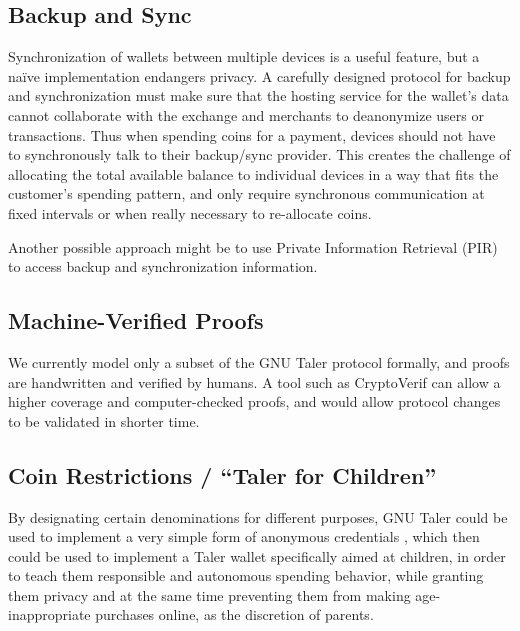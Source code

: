 \subsection*{Backup and Sync}\label{sec:future-work-backup-sync}
Synchronization of wallets between multiple devices is a useful feature, but a
na\"ive implementation endangers privacy.  A carefully designed protocol for
backup and synchronization must make sure that the hosting service for the
wallet's data cannot collaborate with the exchange and merchants to deanonymize
users or transactions.  Thus when spending coins for a payment, devices should
not have to synchronously talk to their backup/sync provider.  This creates the
challenge of allocating the total available balance to individual devices in a
way that fits the customer's spending pattern, and only require synchronous
communication at fixed intervals or when really necessary to re-allocate coins.

Another possible approach might be to use Private Information Retrieval (PIR)
\cite{goldberg2007improving} to access backup and synchronization information.


\subsection*{Machine-Verified Proofs}
We currently model only a subset of the GNU Taler protocol formally, and proofs
are handwritten and verified by humans.  A tool such as CryptoVerif
\cite{blanchet2007cryptoverif} can allow a higher coverage and computer-checked
proofs, and would allow protocol changes to be validated in shorter time.

\subsection*{Coin Restrictions / ``Taler for Children''}
By designating certain denominations for different purposes, GNU Taler could be
used to implement a very simple form of anonymous credentials
\cite{paquin2011u,camenisch2004signature}, which then could be used to
implement a Taler wallet specifically aimed at children, in order to teach them
responsible and autonomous spending behavior, while granting them privacy and
at the same time preventing them from making age-inappropriate purchases
online, as the discretion of parents.

